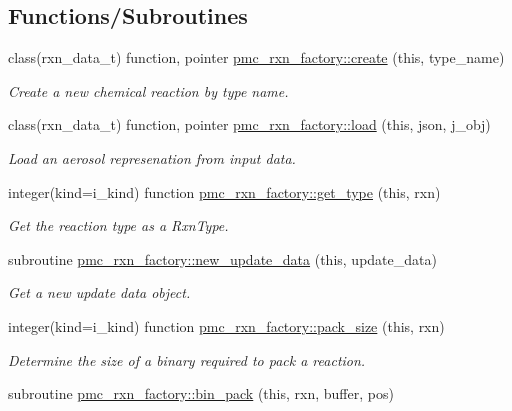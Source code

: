 \subsection*{Functions/\+Subroutines}
\begin{DoxyCompactItemize}
\item 
class(rxn\+\_\+data\+\_\+t) function, pointer \mbox{\hyperlink{namespacepmc__rxn__factory_ad742376c2dae968c0aec048674112073}{pmc\+\_\+rxn\+\_\+factory\+::create}} (this, type\+\_\+name)
\begin{DoxyCompactList}\small\item\em Create a new chemical reaction by type name. \end{DoxyCompactList}\item 
class(rxn\+\_\+data\+\_\+t) function, pointer \mbox{\hyperlink{namespacepmc__rxn__factory_a57a62f05f6c35bc0fe5136416bd6de88}{pmc\+\_\+rxn\+\_\+factory\+::load}} (this, json, j\+\_\+obj)
\begin{DoxyCompactList}\small\item\em Load an aerosol represenation from input data. \end{DoxyCompactList}\item 
integer(kind=i\+\_\+kind) function \mbox{\hyperlink{namespacepmc__rxn__factory_a1cad0d2e8d6f63fa8c0372b2b564535b}{pmc\+\_\+rxn\+\_\+factory\+::get\+\_\+type}} (this, rxn)
\begin{DoxyCompactList}\small\item\em Get the reaction type as a Rxn\+Type. \end{DoxyCompactList}\item 
subroutine \mbox{\hyperlink{namespacepmc__rxn__factory_a212a3d8e44d9a4a79f9969ba0af02133}{pmc\+\_\+rxn\+\_\+factory\+::new\+\_\+update\+\_\+data}} (this, update\+\_\+data)
\begin{DoxyCompactList}\small\item\em Get a new update data object. \end{DoxyCompactList}\item 
integer(kind=i\+\_\+kind) function \mbox{\hyperlink{namespacepmc__rxn__factory_a7e211932d81d6b402bffe60e03d72b72}{pmc\+\_\+rxn\+\_\+factory\+::pack\+\_\+size}} (this, rxn)
\begin{DoxyCompactList}\small\item\em Determine the size of a binary required to pack a reaction. \end{DoxyCompactList}\item 
subroutine \mbox{\hyperlink{namespacepmc__rxn__factory_a5d87b219d8a0537b7b37d08d4e2e72e0}{pmc\+\_\+rxn\+\_\+factory\+::bin\+\_\+pack}} (this, rxn, buffer, pos)

\end{DoxyCompactItemize}
